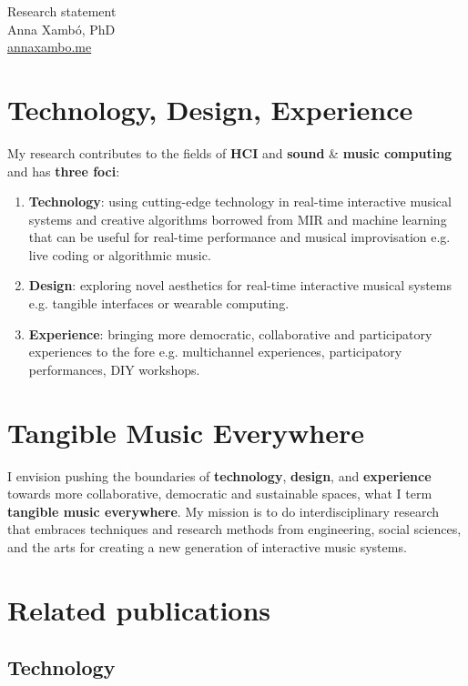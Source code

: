 \documentclass[10pt, a4paper]{article}
\begin{document}
{\LARGE Research statement}\\[0.2cm]
Anna Xambó, PhD\\
\href{http://annaxambo.me}{annaxambo.me}

\section*{Technology, Design, Experience}

My research contributes to the fields of \textbf{HCI} and \textbf{sound} \& \textbf{music computing} and has \textbf{three foci}:

\begin{enumerate}
\item \textbf{Technology}: using cutting-edge technology in real-time interactive musical systems and creative algorithms borrowed from MIR and machine learning that can be useful for real-time performance and musical improvisation e.g. live coding or algorithmic music.
\item \textbf{Design}: exploring novel aesthetics for real-time interactive musical systems e.g. tangible interfaces or wearable computing. 
\item \textbf{Experience}: bringing more democratic, collaborative and participatory experiences to the fore e.g. multichannel experiences, participatory performances, DIY workshops. 
\end{enumerate}

\section*{Tangible Music Everywhere}

I envision pushing the boundaries of \textbf{technology}, \textbf{design}, and \textbf{experience} towards more collaborative, democratic and sustainable spaces, what I term \textbf{tangible music everywhere}. My mission is to do interdisciplinary research that embraces techniques and research methods from engineering, social sciences, and the arts for creating a new generation of interactive music systems.

\section*{Related publications}

\subsection*{Technology}
\end{document}

